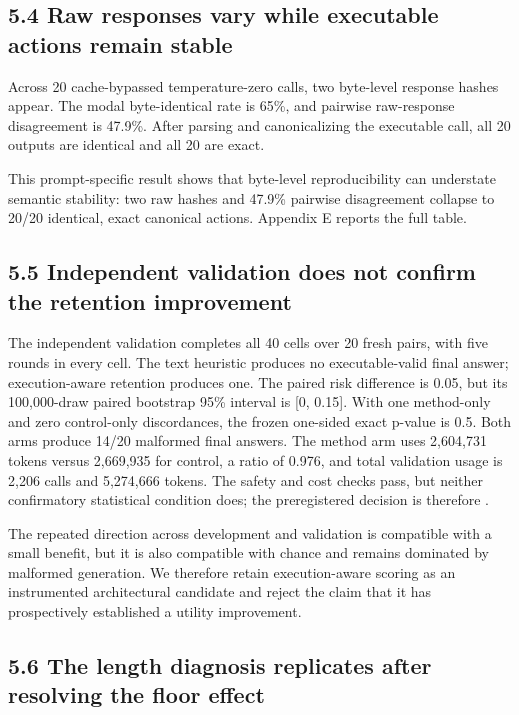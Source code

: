 \documentclass{article}
\begin{document}
\subsection{5.4 Raw responses vary while executable actions remain stable}

Across 20 cache-bypassed temperature-zero calls, two byte-level response hashes appear. The modal byte-identical rate is 65\%, and pairwise raw-response disagreement is 47.9\%. After parsing and canonicalizing the executable call, all 20 outputs are identical and all 20 are exact.

This prompt-specific result shows that byte-level reproducibility can understate semantic stability: two raw hashes and 47.9\% pairwise disagreement collapse to 20/20 identical, exact canonical actions. Appendix E reports the full table.

\subsection{5.5 Independent validation does not confirm the retention improvement}

The independent validation completes all 40 cells over 20 fresh pairs, with five rounds in every cell. The text heuristic produces no executable-valid final answer; execution-aware retention produces one. The paired risk difference is 0.05, but its 100,000-draw paired bootstrap 95\% interval is [0, 0.15]. With one method-only and zero control-only discordances, the frozen one-sided exact p-value is 0.5. Both arms produce 14/20 malformed final answers. The method arm uses 2,604,731 tokens versus 2,669,935 for control, a ratio of 0.976, and total validation usage is 2,206 calls and 5,274,666 tokens. The safety and cost checks pass, but neither confirmatory statistical condition does; the preregistered decision is therefore \texttt{}.

The repeated direction across development and validation is compatible with a small benefit, but it is also compatible with chance and remains dominated by malformed generation. We therefore retain execution-aware scoring as an instrumented architectural candidate and reject the claim that it has prospectively established a utility improvement.

\subsection{5.6 The length diagnosis replicates after resolving the floor effect}
\end{document}
